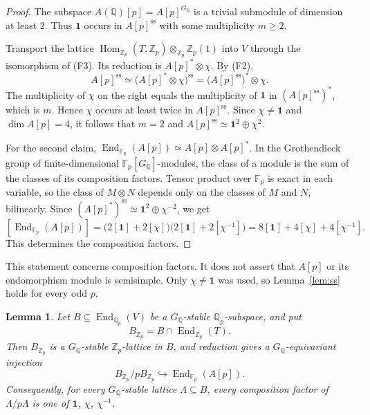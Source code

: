 \documentclass[11pt]{article}
\newtheorem{lemma}{Lemma}
\newcommand{\Q}{\mathbb Q}
\newcommand{\Z}{\mathbb Z}
\newcommand{\F}{\mathbb F}
\DeclareMathOperator{\End}{End}
\begin{document}
\begin{proof}
The subspace \(A(\Q)[p]=A[p]^{G_{\Q}}\) is a trivial submodule of
dimension at least \(2\). Thus \(\mathbf 1\) occurs in
\(A[p]^{\mathrm{ss}}\) with some multiplicity \(m\geq2\).

Transport the lattice
\(\operatorname{Hom}_{\Z_p}(T,\Z_p)\otimes_{\Z_p}\Z_p(1)\) into \(V\)
through the isomorphism of (F3). Its reduction is
\(A[p]^*\otimes\chi\). By (F2),
\[
 A[p]^{\mathrm{ss}}\simeq\bigl(A[p]^*\otimes\chi\bigr)^{\mathrm{ss}}
 =\bigl(A[p]^{\mathrm{ss}}\bigr)^*\otimes\chi.
\]
The multiplicity of \(\chi\) on the right equals the multiplicity of
\(\mathbf 1\) in \((A[p]^{\mathrm{ss}})^*\), which is \(m\). Hence
\(\chi\) occurs at least twice in \(A[p]^{\mathrm{ss}}\). Since
\(\chi\neq\mathbf 1\) and \(\dim A[p]=4\), it follows that \(m=2\) and
\(A[p]^{\mathrm{ss}}\simeq\mathbf 1^2\oplus\chi^2\).

For the second claim,
\(\End_{\F_p}(A[p])\simeq A[p]\otimes A[p]^*\). In the Grothendieck
group of finite-dimensional \(\F_p[G_{\Q}]\)-modules, the class of a
module is the sum of the classes of its composition factors. Tensor
product over \(\F_p\) is exact in each variable, so the class of
\(M\otimes N\) depends only on the classes of \(M\) and \(N\),
bilinearly. Since
\((A[p]^*)^{\mathrm{ss}}\simeq\mathbf 1^2\oplus\chi^{-2}\), we get
\[
 [\End_{\F_p}(A[p])]
 =\bigl(2[\mathbf 1]+2[\chi]\bigr)\bigl(2[\mathbf 1]+2[\chi^{-1}]\bigr)
 =8[\mathbf 1]+4[\chi]+4[\chi^{-1}].
\]
This determines the composition factors.
\end{proof}

This statement concerns composition factors. It does not assert that
\(A[p]\) or its endomorphism module is semisimple. Only
\(\chi\neq\mathbf 1\) was used, so Lemma~\ref{lem:ss} holds for every
odd \(p\).

\begin{lemma}\label{lem:saturated}
Let \(B\subseteq\End_{\Q_p}(V)\) be a \(G_{\Q}\)-stable
\(\Q_p\)-subspace, and put
\[
 B_{\Z_p}=B\cap\End_{\Z_p}(T).
\]
Then \(B_{\Z_p}\) is a \(G_{\Q}\)-stable \(\Z_p\)-lattice in \(B\), and
reduction gives a \(G_{\Q}\)-equivariant injection
\[
 B_{\Z_p}/pB_{\Z_p}\hookrightarrow\End_{\F_p}(A[p]).
\]
Consequently, for every \(G_{\Q}\)-stable lattice
\(\Lambda\subseteq B\), every composition factor of
\(\Lambda/p\Lambda\) is one of \(\mathbf 1\), \(\chi\),
\(\chi^{-1}\).
\end{lemma}
\end{document}
